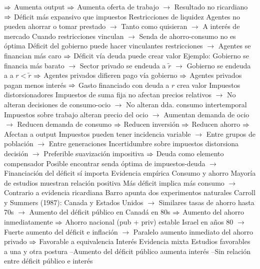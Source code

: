 \documentclass{nuevotema}
\begin{document}
\begin{esquemal}
				\4[] $\then$ Aumenta output
				\4[] $\then$ Aumenta oferta de trabajo
				\4[] $\to$ Resultado no ricardiano
				\4[] $\then$ Déficit más expansivo que impuestos
				\4 Restricciones de liquidez
				\4[] Agentes no pueden ahorrar o tomar prestado
				\4[] $\to$ Tanto como quisieran
				\4[] $\to$ A interés de mercado
				\4[] Cuando restricciones vinculan
				\4[] $\to$ Senda de ahorro-consumo no es óptima
				\4[] Déficit del gobierno puede hacer vinculantes restricciones
				\4[] $\to$ Agentes se financian más caro
				\4[] $\then$ Déficit vía deuda puede crear valor
				\4[] Ejemplo: Gobierno se financia más barato
				\4[] $\to$ Sector privado se endeuda a $\tilde{r}$
				\4[] $\to$ Gobierno se endeuda a a $r < \tilde{r}$
				\4[] $\then$ Agentes privados difieren pago vía gobierno
				\4[] $\then$ Agentes privados pagan menos interés
				\4[] $\then$ Gasto financiado con deuda a $r$ crea valor
				\4 Impuestos distorsionadores
				\4[] Impuestos de suma fija no afectan precios relativos
				\4[] $\to$ No alteran decisiones de consumo-ocio
				\4[] $\to$ No alteran dda. consumo intertemporal
				\4[] Impuestos sobre trabajo alteran precio del ocio
				\4[] $\to$ Aumentan demanda de ocio
				\4[] $\to$ Reducen demanda de consumo
				\4[] $\then$ Reducen inversión
				\4[] $\then$ Reducen ahorro
				\4[] $\then$ Afectan a output
				\4[] Impuestos pueden tener incidencia variable
				\4[] $\to$ Entre grupos de población
				\4[] $\to$ Entre generaciones
				\4[] Incertidumbre sobre impuestos distorsiona decisión
				\4[] $\to$ Preferible suavización impositiva
				\4[] $\then$ Deuda como elemento compensador
				\4[$\then$] Posible encontrar senda óptima de impuestos-deuda
				\4[] $\to$ Financiación del déficit sí importa
		\2 Evidencia empírica
			\3 Consumo y ahorro
				\4 Mayoría de estudios muestran relación positiva
				\4[] Más déficit implica más consumo
				\4[] $\to$ Contrario a evidencia ricardiana
				\4 Barro apunta dos experimentos naturales
				\4[] Carroll y Summers (1987): Canada y Estados Unidos
				\4[] $\to$ Similares tasas de ahorro hasta 70s
				\4[] $\to$ Aumento del déficit público en Canadá en 80s
				\4[] $\then$ Aumento del ahorro inmediatamente
				\4[] $\then$ Ahorro nacional (pub + priv) estable
				\4[] Israel en años 80
				\4[] $\to$ Fuerte aumento del déficit e inflación
				\4[] $\to$ Paralelo aumento inmediato del ahorro privado
				\4[] $\then$ Favorable a equivalencia
			\3 Interés
				\4 Evidencia mixta
				\4 Estudios favorables a una y otra postura
				\4[] --Aumento del déficit público aumenta interés
				\4[] --Sin relación entre déficit público e interés

\end{esquemal}
\end{document}
